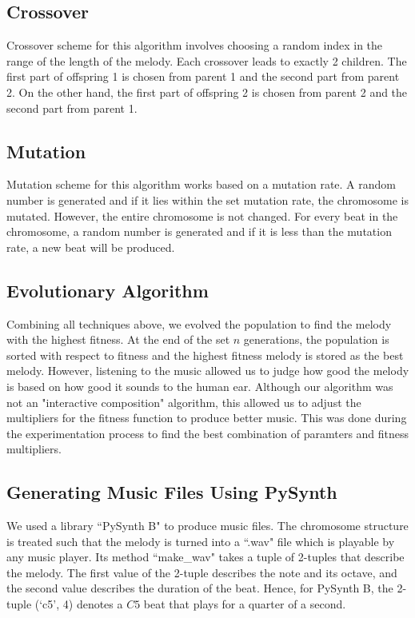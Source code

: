 \documentclass[conference]{IEEEtran}
\begin{document}
\subsection{Crossover}
Crossover scheme for this algorithm involves choosing a random index in the range of the length of the melody. Each crossover leads to exactly 2 children. The first part of offspring 1 is chosen from parent 1 and the second part from parent 2. On the other hand, the first part of offspring 2 is chosen from parent 2 and the second part from parent 1.

\subsection{Mutation}
Mutation scheme for this algorithm works based on a mutation rate. A random number is generated and if it lies within the set mutation rate, the chromosome is mutated. However, the entire chromosome is not changed. For every beat in the chromosome, a random number is generated and if it is less than the mutation rate, a new beat will be produced.

\subsection{Evolutionary Algorithm}
Combining all techniques above, we evolved the population to find the melody with the highest fitness. At the end of the set $n$ generations, the population is sorted with respect to fitness and the highest fitness melody is stored as the best melody. However, listening to the music allowed us to judge how good the melody is based on how good it sounds to the human ear. Although our algorithm was not an "interactive composition" algorithm, this allowed us to adjust the multipliers for the fitness function to produce better music. This was done during the experimentation process to find the best combination of paramters and fitness multipliers.

\subsection{Generating Music Files Using PySynth}
We used a library ``PySynth B" to produce music files. The chromosome structure is treated such that the melody is turned into a ``.wav" file which is playable by any music player. Its method ``make\_wav" takes a tuple of 2-tuples that describe the melody. The first value of the 2-tuple describes the note and its octave, and the second value describes the duration of the beat. Hence, for PySynth B, the 2-tuple (`c5', 4) denotes a $C5$ beat that plays for a quarter of a second.
\end{document}
